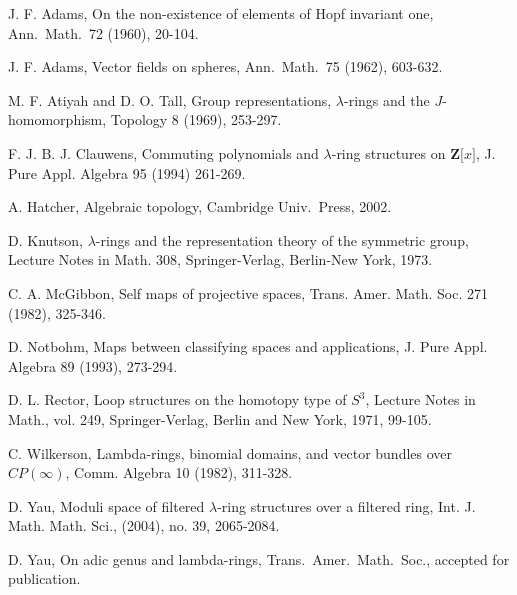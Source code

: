 \documentclass[reqno,11pt]{amsart}
\numberwithin{equation}{subsection}  %
\newcommand{\bZ}{\mathbf{Z}}
\begin{document}
\begin{thebibliography}{99}
J. F. Adams, On the non-existence of elements of Hopf invariant one, Ann.\ Math.\ 72 (1960), 20-104.

J. F. Adams, Vector fields on spheres, Ann.\ Math.\ 75 (1962), 603-632.

M. F. Atiyah and D. O. Tall, Group representations, $\lambda$-rings and the $J$-homomorphism, Topology 8 (1969), 253-297.

F. J. B. J. Clauwens, Commuting polynomials and $\lambda$-ring structures on $\bZ \lbrack x \rbrack$, J. Pure Appl. Algebra 95 (1994) 261-269.

A. Hatcher, Algebraic topology, Cambridge Univ.\ Press, 2002.

D. Knutson, $\lambda $-rings and the representation theory of the symmetric group, Lecture Notes in Math. 308, Springer-Verlag, Berlin-New York, 1973.

C. A. McGibbon, Self maps of projective spaces, Trans. Amer. Math. Soc. 271 (1982), 325-346.

D. Notbohm, Maps between classifying spaces and applications, J. Pure Appl. Algebra 89 (1993), 273-294.

D. L. Rector, Loop structures on the homotopy type of $S^3$, Lecture Notes in Math., vol. 249, Springer-Verlag, Berlin and New York, 1971, 99-105.

C. Wilkerson, Lambda-rings, binomial domains, and vector bundles over $CP(\infty)$, Comm. Algebra 10 (1982), 311-328.

D. Yau, Moduli space of filtered $\lambda$-ring structures over a filtered ring, Int. J. Math. Math. Sci., (2004), no. 39, 2065-2084.

D. Yau, On adic genus and lambda-rings, Trans.\ Amer.\ Math.\ Soc., accepted for publication.

\end{thebibliography}
\end{document}
